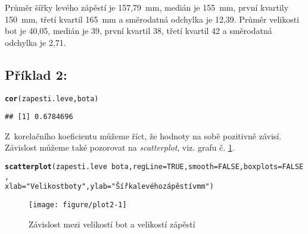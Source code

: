 \documentclass[twoside]{article}\usepackage[]{graphicx}\usepackage[]{color}
\makeatletter
\def\maxwidth{ %
  \ifdim\Gin@nat@width>\linewidth
    \linewidth
  \else
    \Gin@nat@width
  \fi
}
\newcommand{\hlnum}[1]{\textcolor[rgb]{0.686,0.059,0.569}{#1}}%
\newcommand{\hlstr}[1]{\textcolor[rgb]{0.192,0.494,0.8}{#1}}%
\newcommand{\hlopt}[1]{\textcolor[rgb]{0,0,0}{#1}}%
\newcommand{\hlstd}[1]{\textcolor[rgb]{0.345,0.345,0.345}{#1}}%
\newcommand{\hlkwc}[1]{\textcolor[rgb]{0.333,0.667,0.333}{#1}}%
\newcommand{\hlkwd}[1]{\textcolor[rgb]{0.737,0.353,0.396}{\textbf{#1}}}%
\newenvironment{kframe}{%
 \def\at@end@of@kframe{}%
 \ifinner\ifhmode%
  \def\at@end@of@kframe{\end{minipage}}%
  \begin{minipage}{\columnwidth}%
 \fi\fi%
 \def\FrameCommand##1{\hskip\@totalleftmargin \hskip-\fboxsep
 \colorbox{shadecolor}{##1}\hskip-\fboxsep
     \hskip-\linewidth \hskip-\@totalleftmargin \hskip\columnwidth}%
 \MakeFramed {\advance\hsize-\width
   \@totalleftmargin\z@ \linewidth\hsize
   \@setminipage}}%
 {\par\unskip\endMakeFramed%
 \at@end@of@kframe}
\newenvironment{knitrout}{}{} %
\makeatother
\begin{document}
Průměr šířky levého zápěstí je 157,79~\si{\milli\metre}, medián je 155~\si{\milli\metre}, první kvartily 150~\si{\milli\metre}, třetí kvartil 165~\si{\milli\metre} a směrodatná odchylka je 12,39. Průměr velikosti bot je 40,05, medián je 39, první kvartil 38, třetí kvartil 42 a směrodatná odchylka je 2,71.

\subsection*{Příklad 2:}
\begin{knitrout}
\color{fgcolor}\begin{kframe}
\begin{alltt}
\hlkwd{cor}\hlstd{(zapesti.leve, bota)}
\end{alltt}
\begin{verbatim}
## [1] 0.6784696
\end{verbatim}
\end{kframe}
\end{knitrout}

Z~korelačního koeficientu můžeme říct, že hodnoty na sobě pozitivně závisí. Závislost můžeme také pozorovat na \emph{scatterplot}, viz. grafu č. \ref{fig:plot2}.
\begin{knitrout}
\color{fgcolor}\begin{kframe}
\begin{alltt}
\hlkwd{scatterplot}\hlstd{(zapesti.leve}\hlopt{~}\hlstd{bota,} \hlkwc{regLine}\hlstd{=}\hlnum{TRUE}\hlstd{,} \hlkwc{smooth}\hlstd{=}\hlnum{FALSE}\hlstd{,} \hlkwc{boxplots}\hlstd{=}\hlnum{FALSE}\hlstd{,}
    \hlkwc{xlab}\hlstd{=}\hlstr{"Velikost boty"}\hlstd{,} \hlkwc{ylab}\hlstd{=}\hlstr{"Šířka levého zápěstí v mm"}\hlstd{)}
\end{alltt}
\end{kframe}\begin{figure}[h]
\texttt{[image: figure/plot2-1]} \caption[Závislost mezi velikostí bot a velikostí zápěstí]{Závislost mezi velikostí bot a velikostí zápěstí}\label{fig:plot2}
\end{figure}


\end{knitrout}


\newpage
\end{document}
